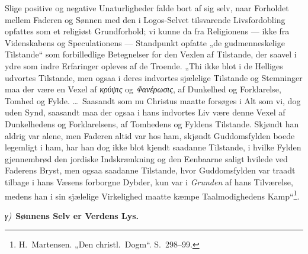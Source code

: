 \documentclass[12pt]{book}
\newcommand{\greekrun}[2]{%
  \medskip\begin{center}{\itshape #1)}\ {\bfseries #2}\end{center}\medskip}
\begin{document}
Slige positive og negative Unaturligheder falde bort af sig selv,
naar Forholdet mellem Faderen og Sønnen med den i Logos-Selvet
tilsvarende Livsfordobling opfattes som et religiøst Grundforhold;
vi kunne da fra Religionens --- ikke fra Videnskabens og
Speculationens --- Standpunkt opfatte „de gudmenneskelige Tilstande“
som forbilledlige Betegnelser for den Vexlen af Tilstande, der
saavel i ydre som indre Erfaringer opleves af de Troende. „Thi ikke
blot i de Helliges udvortes Tilstande, men ogsaa i deres indvortes
sjælelige Tilstande og Stemninger maa der være en Vexel af
\textit{κρύψις} og \textit{Φανέρωσις}, af Dunkelhed og Forklarelse,
Tomhed og Fylde. \dots\ Saasandt som nu Christus maatte forsøges i
Alt som vi, dog uden Synd, saasandt maa der ogsaa i hans indvortes
Liv være denne Vexel af Dunkelhedens og Forklarelsens, af Tomhedens
og Fyldens Tilstande. Skjøndt han aldrig var alene, men Faderen
altid var hos ham, skjøndt Guddomsfylden boede legemligt i ham, har
han dog ikke blot kjendt saadanne Tilstande, i hvilke Fylden
gjennembrød den jordiske Indskrænkning og den Eenbaarne saligt
hvilede ved Faderens Bryst, men ogsaa saadanne Tilstande, hvor
Guddomsfylden var traadt tilbage i hans Væsens forborgne Dybder, kun
var i \emph{Grunden} af hans Tilværelse, medens han i sin sjælelige
Virkelighed maatte kæmpe Taalmodighedens Kamp“\footnote{H.\
Martensen. „Den christl.\ Dogm“. S.\ 298--99.}.

\greekrun{γ}{Sønnens Selv er Verdens Lys.}
\end{document}
